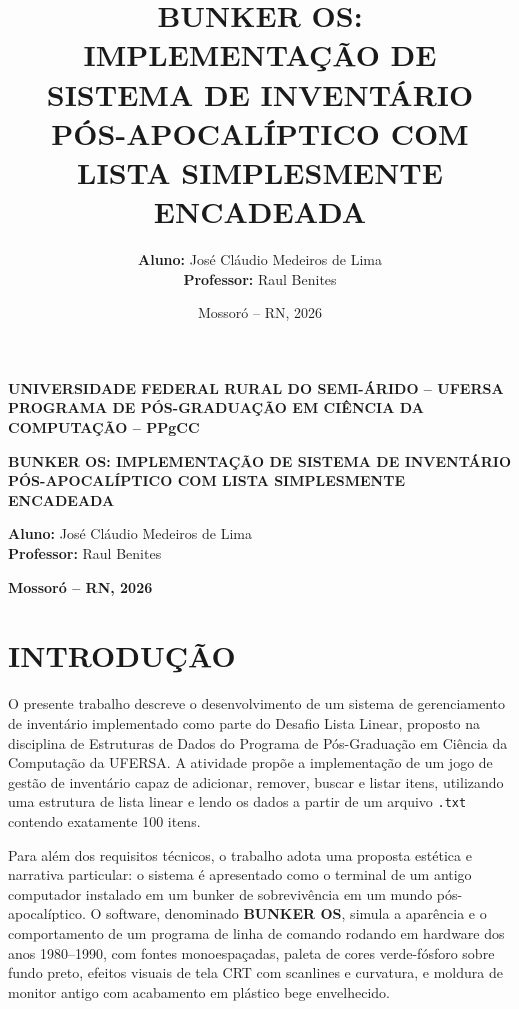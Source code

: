 \documentclass[12pt,a4paper]{article}
\title{\textbf{BUNKER OS: IMPLEMENTAÇÃO DE SISTEMA DE INVENTÁRIO PÓS-APOCALÍPTICO COM LISTA SIMPLESMENTE ENCADEADA}}
\author{\textbf{Aluno:} José Cláudio Medeiros de Lima \\ \textbf{Professor:} Raul Benites}
\date{Mossoró – RN, 2026}
\begin{document}
\begin{center}
    \Large \textbf{UNIVERSIDADE FEDERAL RURAL DO SEMI-ÁRIDO – UFERSA} \\
    \Large \textbf{PROGRAMA DE PÓS-GRADUAÇÃO EM CIÊNCIA DA COMPUTAÇÃO – PPgCC}
\end{center}

\vspace{2cm}

\begin{center}
    \LARGE \textbf{BUNKER OS: IMPLEMENTAÇÃO DE SISTEMA DE INVENTÁRIO PÓS-APOCALÍPTICO COM LISTA SIMPLESMENTE ENCADEADA}
\end{center}

\vspace{1cm}

\noindent \textbf{Aluno:} José Cláudio Medeiros de Lima \\
\textbf{Professor:} Raul Benites

\vspace{2cm}

\begin{center}
    \textbf{Mossoró – RN, 2026}
\end{center}

\newpage

\section{INTRODUÇÃO}

O presente trabalho descreve o desenvolvimento de um sistema de gerenciamento de inventário implementado como parte do Desafio Lista Linear, proposto na disciplina de Estruturas de Dados do Programa de Pós-Graduação em Ciência da Computação da UFERSA. A atividade propõe a implementação de um jogo de gestão de inventário capaz de adicionar, remover, buscar e listar itens, utilizando uma estrutura de lista linear e lendo os dados a partir de um arquivo \texttt{.txt} contendo exatamente 100 itens.

Para além dos requisitos técnicos, o trabalho adota uma proposta estética e narrativa particular: o sistema é apresentado como o terminal de um antigo computador instalado em um bunker de sobrevivência em um mundo pós-apocalíptico. O software, denominado \textbf{BUNKER OS}, simula a aparência e o comportamento de um programa de linha de comando rodando em hardware dos anos 1980–1990, com fontes monoespaçadas, paleta de cores verde-fósforo sobre fundo preto, efeitos visuais de tela CRT com scanlines e curvatura, e moldura de monitor antigo com acabamento em plástico bege envelhecido.
\end{document}

